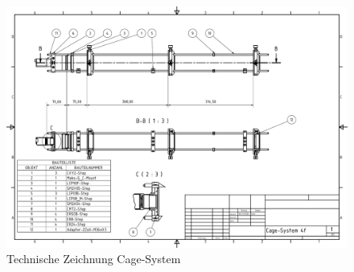 \documentclass[titlepage]{article}
\begin{document}
	\begin{figure}
		\includegraphics[width=\textwidth]{figures/4f_system.pdf}
		\caption{Technische Zeichnung Cage-System}
		\label{fig:tz_cage_system}
	\end{figure}
	\newpage
\end{document}
